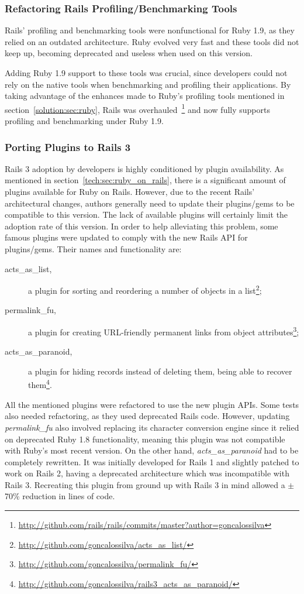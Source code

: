 \subsubsection{Refactoring Rails Profiling/Benchmarking Tools}
Rails' profiling and benchmarking tools were nonfunctional for Ruby 1.9, as they relied on an outdated architecture. Ruby evolved very fast and these tools did not keep up, becoming deprecated and useless when used on this version.

Adding Ruby 1.9  support to these tools was crucial, since developers could not rely on the native tools when benchmarking and profiling their applications. By taking advantage of the enhances made to Ruby's profiling tools mentioned in section~\ref{solution:sec:ruby}, Rails was overhauled~\footnote{\url{http://github.com/rails/rails/commits/master?author=goncalossilva}} and now fully supports profiling and benchmarking under Ruby 1.9.


\subsubsection{Porting Plugins to Rails 3}
Rails 3 adoption by developers is highly conditioned by plugin availability. As mentioned in section~\ref{tech:sec:ruby_on_rails}, there is a significant amount of plugins available for Ruby on Rails. However, due to the recent Rails' architectural changes, authors generally need to update their plugins/gems to be compatible to this version. The lack of available plugins will certainly limit the adoption rate of this version. In order to help alleviating this problem, some famous plugins were updated to comply with the new Rails API for plugins/gems. Their names and functionality are:
\begin{description}
  \item[acts\_as\_list,] a plugin for sorting and reordering a number of objects in a list\footnote{\url{http://github.com/goncalossilva/acts_as_list/}};
  \item[permalink\_fu,] a plugin for creating URL-friendly permanent links from object attributes\footnote{\url{http://github.com/goncalossilva/permalink_fu/}};
  \item[acts\_as\_paranoid,] a plugin for hiding records instead of deleting them, being able to recover them\footnote{\url{http://github.com/goncalossilva/rails3_acts_as_paranoid/}}.
\end{description}
All the mentioned plugins were refactored to use the new plugin APIs. Some tests also needed refactoring, as they used deprecated Rails code. However, updating \textit{permalink\_fu} also involved replacing its character conversion engine since it relied on deprecated Ruby 1.8 functionality, meaning this plugin was not compatible with Ruby's most recent version. On the other hand, \textit{acts\_as\_paranoid} had to be completely rewritten. It was initially developed for Rails 1 and slightly patched to work on Rails 2, having a deprecated architecture which was incompatible with Rails 3. Recreating this plugin from ground up with Rails 3 in mind allowed a $\pm$70\% reduction in lines of code.


